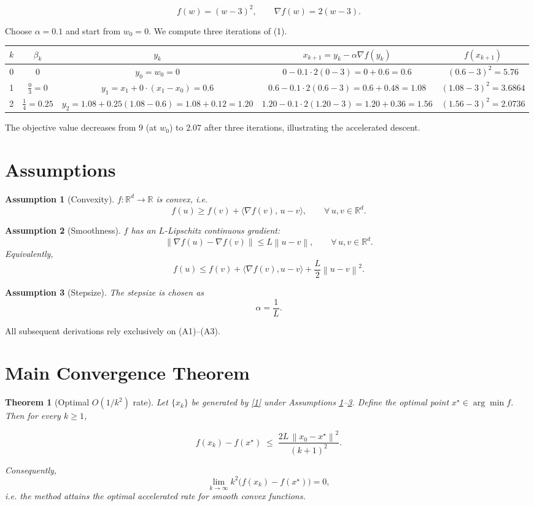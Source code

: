 \documentclass{article}
\newtheorem{theorem}{Theorem}
\newtheorem{assumption}{Assumption}
\newcommand{\grad}{\nabla}
\newcommand{\R}{\mathbb{R}}
\newcommand{\norm}[1]{\left\|#1\right\|}
\begin{document}
\[
f(w) = (w-3)^2, \qquad \grad f(w)=2(w-3).
\]

Choose \(\alpha = 0.1\) and start from \(w_0=0\).  
We compute three iterations of (1).

\begin{center}
\begin{tabular}{c|c|c|c|c}
\(k\) & \(\beta_k\) & \(y_k\) & \(x_{k+1}=y_k-\alpha\grad f(y_k)\) & \(f(x_{k+1})\)\\ \hline
0 & \(0\) & \(y_0 = w_0 =0\) &
\(0-0.1\cdot 2(0-3)=0+0.6=0.6\) &
\((0.6-3)^2 = 5.76\)\\[4pt]
1 & \(\frac{0}{3}=0\) &
\(y_1 = x_1 +0\cdot(x_1-x_0)=0.6\) &
\(0.6-0.1\cdot 2(0.6-3)=0.6+0.48=1.08\) &
\((1.08-3)^2 =3.6864\)\\[4pt]
2 & \(\frac{1}{4}=0.25\) &
\(y_2 = 1.08+0.25(1.08-0.6)=1.08+0.12=1.20\) &
\(1.20-0.1\cdot 2(1.20-3)=1.20+0.36=1.56\) &
\((1.56-3)^2 =2.0736\)\\
\end{tabular}
\end{center}

The objective value decreases from \(9\) (at \(w_0\)) to \(2.07\) after three
iterations, illustrating the accelerated descent.

\newpage
\section*{Assumptions}
\begin{assumption}[Convexity]\label{ass:convex}
\(f:\R^{d}\to\R\) is convex, i.e.
\[
f(u)\ge f(v)+\langle \grad f(v),\,u-v\rangle,\qquad \forall\,u,v\in\R^{d}.
\tag{A1}
\]
\end{assumption}
\begin{assumption}[Smoothness]\label{ass:smooth}
\(f\) has an \(L\)-Lipschitz continuous gradient:
\[
\norm{\grad f(u)-\grad f(v)}\le L\norm{u-v},\qquad \forall\,u,v\in\R^{d}.
\tag{A2}
\]
Equivalently,
\[
f(u)\le f(v)+\langle \grad f(v),u-v\rangle+\frac{L}{2}\norm{u-v}^{2}.
\tag{A2$'$}
\]
\end{assumption}
\begin{assumption}[Stepsize]\label{ass:stepsize}
The stepsize is chosen as
\[
\alpha = \frac{1}{L}.
\tag{A3}
\]
\end{assumption}
All subsequent derivations rely exclusively on (A1)–(A3).

\section*{Main Convergence Theorem}
\begin{theorem}[Optimal \(O(1/k^{2})\) rate]\label{thm:rate}
Let \(\{x_k\}\) be generated by \eqref{1} under Assumptions
\ref{ass:convex}–\ref{ass:stepsize}.
Define the optimal point \(x^{\star}\in\arg\min f\).
Then for every \(k\ge 1\),

\[
f(x_k)-f(x^{\star})\;\le\;
\frac{2L\,\norm{x_0-x^{\star}}^{2}}{(k+1)^{2}}.
\tag{2}
\]

Consequently,
\[
\lim_{k\to\infty}k^{2}\bigl(f(x_k)-f(x^{\star})\bigr)=0,
\]
i.e. the method attains the optimal accelerated rate for smooth convex
functions.
\end{theorem}
\end{document}
